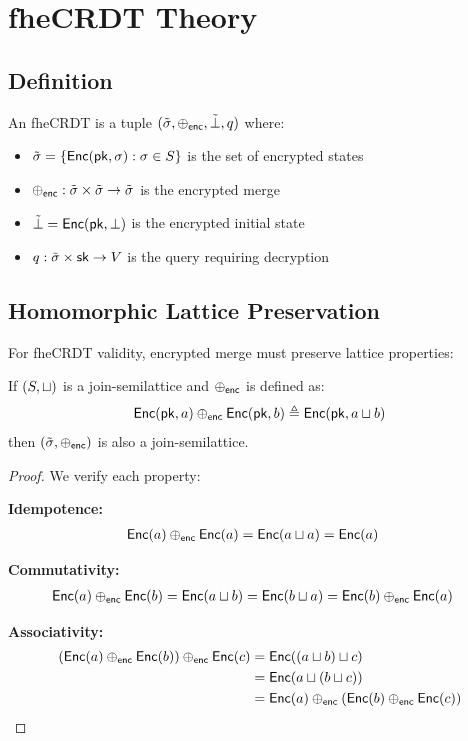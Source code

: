 \documentclass{../shared/luxfhe}
\begin{document}
\section{fheCRDT Theory}

\subsection{Definition}

\begin{definition}[fheCRDT]
An fheCRDT is a tuple $(\tilde{\sigma}, \oplus_{\mathsf{enc}}, \tilde{\bot}, q)$ where:
\begin{itemize}[noitemsep]
    \item $\tilde{\sigma} = \{\mathsf{Enc}(\mathsf{pk}, \sigma) : \sigma \in S\}$ is the set of encrypted states
    \item $\oplus_{\mathsf{enc}}: \tilde{\sigma} \times \tilde{\sigma} \to \tilde{\sigma}$ is the encrypted merge
    \item $\tilde{\bot} = \mathsf{Enc}(\mathsf{pk}, \bot)$ is the encrypted initial state
    \item $q: \tilde{\sigma} \times \mathsf{sk} \to V$ is the query requiring decryption
\end{itemize}
\end{definition}

\subsection{Homomorphic Lattice Preservation}

For fheCRDT validity, encrypted merge must preserve lattice properties:

\begin{theorem}
\label{thm:lattice}
If $(S, \sqcup)$ is a join-semilattice and $\oplus_{\mathsf{enc}}$ is defined as:
\[
\mathsf{Enc}(\mathsf{pk}, a) \oplus_{\mathsf{enc}} \mathsf{Enc}(\mathsf{pk}, b) \triangleq \mathsf{Enc}(\mathsf{pk}, a \sqcup b)
\]
then $(\tilde{\sigma}, \oplus_{\mathsf{enc}})$ is also a join-semilattice.
\end{theorem}

\begin{proof}
We verify each property:

\textbf{Idempotence:}
\begin{align}
\mathsf{Enc}(a) \oplus_{\mathsf{enc}} \mathsf{Enc}(a) &= \mathsf{Enc}(a \sqcup a) = \mathsf{Enc}(a)
\end{align}

\textbf{Commutativity:}
\begin{align}
\mathsf{Enc}(a) \oplus_{\mathsf{enc}} \mathsf{Enc}(b) &= \mathsf{Enc}(a \sqcup b) = \mathsf{Enc}(b \sqcup a) = \mathsf{Enc}(b) \oplus_{\mathsf{enc}} \mathsf{Enc}(a)
\end{align}

\textbf{Associativity:}
\begin{align}
(\mathsf{Enc}(a) \oplus_{\mathsf{enc}} \mathsf{Enc}(b)) \oplus_{\mathsf{enc}} \mathsf{Enc}(c) &= \mathsf{Enc}((a \sqcup b) \sqcup c) \\
&= \mathsf{Enc}(a \sqcup (b \sqcup c)) \\
&= \mathsf{Enc}(a) \oplus_{\mathsf{enc}} (\mathsf{Enc}(b) \oplus_{\mathsf{enc}} \mathsf{Enc}(c))
\end{align}
\end{proof}
\end{document}
